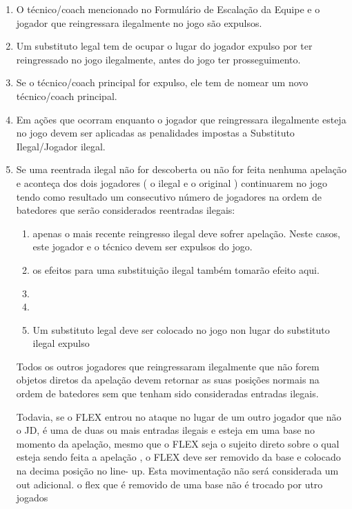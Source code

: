 \begin{enumerate}[label=(\alph*)]
\begin{enumerate}[label=(\alph*)]
	\item O técnico/\gls{coach} mencionado no Formulário de Escalação da Equipe e o jogador que reingressara ilegalmente no jogo são expulsos.
	\item Um substituto legal tem de ocupar o lugar do jogador expulso por ter reingressado no jogo ilegalmente, antes do jogo ter prosseguimento.
	\item Se o técnico/\gls{coach} principal for expulso, ele tem de nomear um novo técnico/\gls{coach} principal.
	\item Em ações que ocorram enquanto o jogador que reingressara ilegalmente esteja no jogo devem ser aplicadas as penalidades impostas a Substituto Ilegal/Jogador ilegal.
	\item Se uma reentrada ilegal não for descoberta ou não for feita nenhuma  apelação e aconteça dos dois jogadores ( o ilegal e o original ) continuarem no jogo tendo como resultado um consecutivo número de jogadores na ordem de batedores que serão considerados reentradas ilegais:

	 \begin{enumerate}[label=\roman*.]
	 	\item apenas o mais recente reingresso ilegal deve sofrer apelação. Neste casos, este jogador e o técnico devem ser expulsos do jogo.
		\item os efeitos para uma substituição ilegal também tomarão efeito aqui.
		\item
		\item
	 	\item Um substituto legal deve ser colocado no jogo non lugar do substituto ilegal expulso
	 \end{enumerate}

Todos os outros jogadores que reingressaram ilegalmente que não forem objetos diretos da apelação devem retornar as suas posições normais na ordem de batedores sem que tenham sido consideradas entradas ilegais.

 Todavia, se o FLEX entrou no ataque no lugar de um outro jogador que não o JD, é uma de duas ou mais entradas ilegais e esteja em uma base no momento da apelação, mesmo que o FLEX seja o sujeito direto sobre o qual esteja sendo feita a apelação , o FLEX deve ser removido da base e colocado na decima posição no line- up. Esta movimentação não será considerada um out adicional. o flex que é removido de uma base não é trocado por utro jogados
\end{enumerate}
\end{enumerate}

